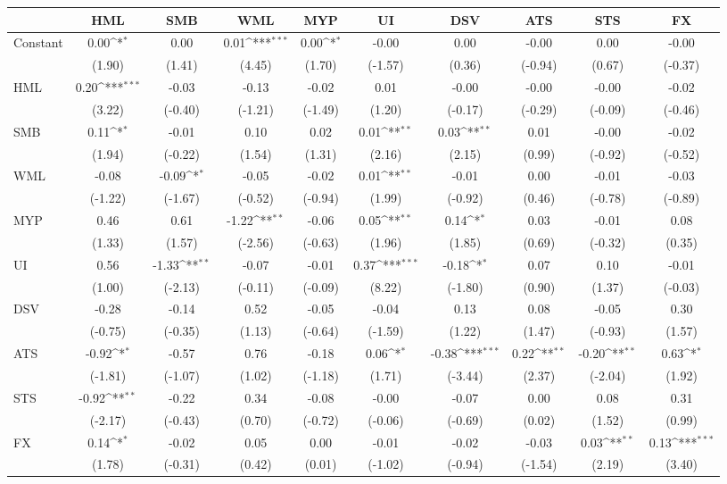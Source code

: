 {
\def\sym#1{\ifmmode^{#1}\else\(^{#1}\)\fi}
\begin{tabular}{@{\extracolsep{2pt}}l*{9}{c}@{}}
\hline\hline
& HML& SMB& WML& MYP& UI& DSV& ATS& STS& FX\\
\hline
Constant & 0.00\sym{*} & 0.00 & 0.01\sym{***} & 0.00\sym{*} & -0.00 & 0.00 & -0.00 & 0.00 & -0.00\\
   & (1.90) & (1.41) & (4.45) & (1.70) & (-1.57) & (0.36) & (-0.94) & (0.67) & (-0.37)\\
HML & 0.20\sym{***} & -0.03 & -0.13 & -0.02 & 0.01 & -0.00 & -0.00 & -0.00 & -0.02\\
   & (3.22) & (-0.40) & (-1.21) & (-1.49) & (1.20) & (-0.17) & (-0.29) & (-0.09) & (-0.46)\\
SMB & 0.11\sym{*} & -0.01 & 0.10 & 0.02 & 0.01\sym{**} & 0.03\sym{**} & 0.01 & -0.00 & -0.02\\
   & (1.94) & (-0.22) & (1.54) & (1.31) & (2.16) & (2.15) & (0.99) & (-0.92) & (-0.52)\\
WML & -0.08 & -0.09\sym{*} & -0.05 & -0.02 & 0.01\sym{**} & -0.01 & 0.00 & -0.01 & -0.03\\
   & (-1.22) & (-1.67) & (-0.52) & (-0.94) & (1.99) & (-0.92) & (0.46) & (-0.78) & (-0.89)\\
MYP & 0.46 & 0.61 & -1.22\sym{**} & -0.06 & 0.05\sym{**} & 0.14\sym{*} & 0.03 & -0.01 & 0.08\\
   & (1.33) & (1.57) & (-2.56) & (-0.63) & (1.96) & (1.85) & (0.69) & (-0.32) & (0.35)\\
UI & 0.56 & -1.33\sym{**} & -0.07 & -0.01 & 0.37\sym{***} & -0.18\sym{*} & 0.07 & 0.10 & -0.01\\
   & (1.00) & (-2.13) & (-0.11) & (-0.09) & (8.22) & (-1.80) & (0.90) & (1.37) & (-0.03)\\
DSV & -0.28 & -0.14 & 0.52 & -0.05 & -0.04 & 0.13 & 0.08 & -0.05 & 0.30\\
   & (-0.75) & (-0.35) & (1.13) & (-0.64) & (-1.59) & (1.22) & (1.47) & (-0.93) & (1.57)\\
ATS & -0.92\sym{*} & -0.57 & 0.76 & -0.18 & 0.06\sym{*} & -0.38\sym{***} & 0.22\sym{**} & -0.20\sym{**} & 0.63\sym{*}\\
   & (-1.81) & (-1.07) & (1.02) & (-1.18) & (1.71) & (-3.44) & (2.37) & (-2.04) & (1.92)\\
STS & -0.92\sym{**} & -0.22 & 0.34 & -0.08 & -0.00 & -0.07 & 0.00 & 0.08 & 0.31\\
   & (-2.17) & (-0.43) & (0.70) & (-0.72) & (-0.06) & (-0.69) & (0.02) & (1.52) & (0.99)\\
FX & 0.14\sym{*} & -0.02 & 0.05 & 0.00 & -0.01 & -0.02 & -0.03 & 0.03\sym{**} & 0.13\sym{***}\\
   & (1.78) & (-0.31) & (0.42) & (0.01) & (-1.02) & (-0.94) & (-1.54) & (2.19) & (3.40)\\
\hline
\hline
\end{tabular}
}
